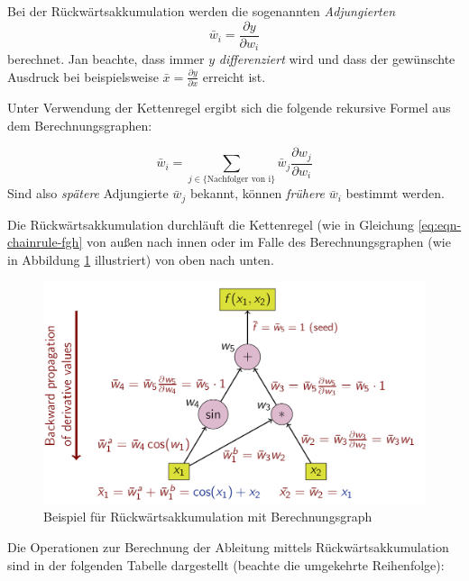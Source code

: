 \documentclass[
]{book}
\theoremstyle{definition}
\theoremstyle{definition}
\theoremstyle{definition}
\theoremstyle{definition}
\theoremstyle{remark}
\begin{document}
Bei der Rückwärtsakkumulation werden die sogenannten \emph{Adjungierten}
\begin{equation*}
\bar{w}_i = \frac{\partial y}{\partial w_i}
\end{equation*}
berechnet. Jan beachte, dass immer \(y\) \emph{differenziert} wird und dass der
gewünschte Ausdruck bei beispielsweise \(\bar x = \frac{\partial y}{\partial x}\) erreicht ist.

Unter Verwendung der Kettenregel ergibt sich die folgende rekursive Formel aus dem
Berechnungsgraphen:

\[\bar{w}_i = \sum_{j \in \{\text{Nachfolger von i}\}} \bar{w}_j \frac{\partial w_j}{\partial w_i}\]
Sind also \emph{spätere} Adjungierte \(\bar w_j\) bekannt, können
\emph{frühere} \(\bar w_i\) bestimmt werden.

Die Rückwärtsakkumulation durchläuft die Kettenregel (wie in Gleichung
\eqref{eq:eqn-chainrule-fgh} von außen nach
innen oder im Falle des Berechnungsgraphen (wie in Abbildung \ref{fig:10-ad-bw} illustriert) von oben nach unten.

\begin{figure}
\hypertarget{fig:10-ad-bw}{%
\centering
\includegraphics[width=1\textwidth,height=\textheight]{bilder/ReverseaccumulationAD.png}
\caption{Beispiel für Rückwärtsakkumulation mit Berechnungsgraph}\label{fig:10-ad-bw}
}
\end{figure}

Die Operationen zur Berechnung der Ableitung mittels Rückwärtsakkumulation sind in der folgenden Tabelle dargestellt (beachte die umgekehrte Reihenfolge):
\end{document}
